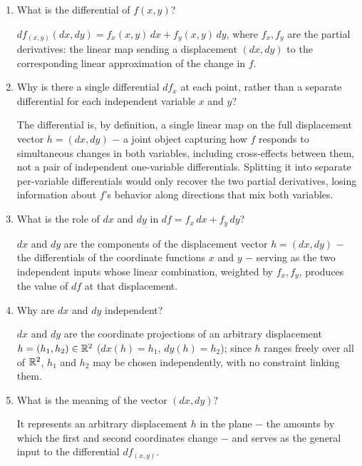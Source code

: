 \documentclass{essay}
\begin{document}
\begin{enumerate}[resume, leftmargin=*, itemsep=8pt]

\item What is the differential of \(f(x,y)\)?
\begin{answer}
\(df_{(x,y)}(dx,dy)=f_x(x,y)\,dx+f_y(x,y)\,dy\), where \(f_x,f_y\) are the partial derivatives: the linear map sending a displacement \((dx,dy)\) to the corresponding linear approximation of the change in \(f\).
\end{answer}

\item Why is there a single differential \(df_x\) at each point, rather than a separate differential for each independent variable \(x\) and \(y\)?
\begin{answer}
The differential is, by definition, a single linear map on the full displacement vector \(h=(dx,dy)\) \(-\) a joint object capturing how \(f\) responds to simultaneous changes in both variables, including cross-effects between them, not a pair of independent one-variable differentials. Splitting it into separate per-variable differentials would only recover the two partial derivatives, losing information about \(f\)'s behavior along directions that mix both variables.
\end{answer}

\item What is the role of \(dx\) and \(dy\) in \(df=f_x\,dx+f_y\,dy\)?
\begin{answer}
\(dx\) and \(dy\) are the components of the displacement vector \(h=(dx,dy)\) \(-\) the differentials of the coordinate functions \(x\) and \(y\) \(-\) serving as the two independent inputs whose linear combination, weighted by \(f_x,f_y\), produces the value of \(df\) at that displacement.
\end{answer}

\item Why are \(dx\) and \(dy\) independent?
\begin{answer}
\(dx\) and \(dy\) are the coordinate projections of an arbitrary displacement \(h=(h_1,h_2)\in\mathbb{R}^2\) (\(dx(h)=h_1\), \(dy(h)=h_2\)); since \(h\) ranges freely over all of \(\mathbb{R}^2\), \(h_1\) and \(h_2\) may be chosen independently, with no constraint linking them.
\end{answer}

\item What is the meaning of the vector \((dx,dy)\)?
\begin{answer}
It represents an arbitrary displacement \(h\) in the plane \(-\) the amounts by which the first and second coordinates change \(-\) and serves as the general input to the differential \(df_{(x,y)}\).
\end{answer}


\end{enumerate}
\end{document}
